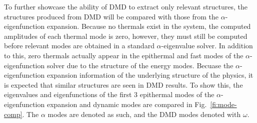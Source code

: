 \documentclass[12pt]{article}
\newcommand{\FI}[1]{Fig.~\ref{fi:#1}}
\begin{document}
To further showcase the ability of DMD to extract only relevant structures, the structures produced 
	from DMD will be compared with those from the $\alpha$-eigenfunction expansion.
Because no thermals exist in the system, the computed amplitudes of each thermal mode is zero, 
	however, they must still be computed before relevant modes are obtained in a standard 
	$\alpha$-eigenvalue solver.
In addition to this, zero thermals actually appear in the epithermal and fast modes of the 
	$\alpha$-eigenfunction solver due to the structure of the energy modes. 
Becuase the $\alpha$-eigenfunction expansion information of the underlying structure of the physics,
	it is expected that similar structures are seen in DMD results.
To show this, the eigenvalues and eigenfunctions of the first 3 epithermal modes of the
	$\alpha$-eigenfunction expansion and dynamic modes are compared in \FI{mode-comp}.
The $\alpha$ modes are denoted as such, and the DMD modes denoted with $\omega$.
\end{document}
